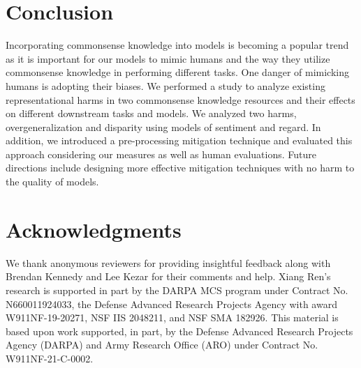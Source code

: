 \section{Conclusion}
Incorporating commonsense knowledge into models is becoming a popular trend as it is important for our models to mimic humans and the way they utilize commonsense knowledge in performing different tasks. One danger of mimicking humans is adopting their biases. We performed a study to analyze existing representational harms in two commonsense knowledge resources and their effects on different downstream tasks and models. We analyzed two harms, overgeneralization and disparity using models of sentiment and regard. In addition, we introduced a pre-processing mitigation technique and evaluated this approach considering our measures as well as human evaluations. Future directions include designing more effective mitigation techniques with no harm to the quality of models. 

\section*{Acknowledgments}
We thank anonymous reviewers for providing insightful feedback along with Brendan Kennedy and Lee Kezar for their comments and help. Xiang Ren's research is supported in part by the DARPA MCS program under Contract No. N660011924033, the Defense Advanced Research Projects Agency with award W911NF-19-20271, NSF IIS 2048211, and NSF SMA 182926. This material is based upon work supported, in part, by the Defense Advanced Research Projects Agency (DARPA) and Army Research Office (ARO) under Contract No. W911NF-21-C-0002.

